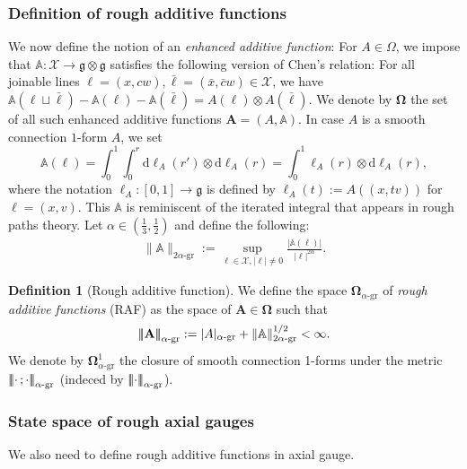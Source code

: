 \documentclass[12pt]{article}
\numberwithin{equation}{section}
\theoremstyle{definition}
\newtheorem{definition}[theorem]{Definition}
\theoremstyle{remark}
\newcommand{\diff}{\mathrm{d}}
\newcommand{\1}{\mathbf 1}
\newcommand{\<}{\langle}
\renewcommand{\>}{\rangle}
\newcommand{\gr}{\text{-}\mathrm{gr}}
\newcommand{\green}[1]{\textcolor{darkgreen}{#1}}
\newcommand{\bfA}{\mathbf A}
\newcommand{\bA}{\mathbb A}
\newcommand{\bfOmega}{\boldsymbol{\Omega}}
\newcommand{\cX}{\mathcal X}
\newcommand{\fg}{\mathfrak g}
\newcommand{\vertiii}[1]{{\left\vert\kern-0.4ex\left\vert\kern-0.4ex\left\vert #1 
    \right\vert\kern-0.4ex\right\vert\kern-0.4ex\right\vert}}
\newcommand{\triple}[1]{\vertiii{#1}}
\begin{document}
\subsubsection{Definition of rough additive functions}
%
We now define the notion of an \emph{enhanced additive function}: 
%
For $A\in\Omega$, we impose that  $\bA:\cX\to \fg\otimes \fg$ satisfies the following version of Chen's relation: 
%
For all joinable lines $\ell=(x,cw),\bar\ell=(\bar x,\bar cw)\in\cX$, we have $\bA(\ell\sqcup \bar\ell)-\bA(\ell)-\bA(\bar\ell)=A(\ell)\otimes A(\bar \ell)$.
We denote by $\bfOmega$ the set of all such enhanced additive functions $\bfA=(A,\bA)$.  In case $A$ is a smooth connection $1$-form $A$, we set
%
$$\bA(\ell)=\int^1_0\int^r_0 \diff\ell_A(r') \otimes\diff\ell_A(r)=\int^1_0\ell_A(r)\otimes\diff\ell_A(r),$$
%
where the notation $\ell_A:[0,1]\to\fg$ is defined by $\ell_A(t):=A((x,tv))$ for $\ell=(x,v)$. This $\bA$ is reminiscent of the iterated integral that appears in rough paths theory. 
%
Let $\alpha\in (\frac 13,\frac 12)$ and define the following:
\begin{align}
\|\bA\|_{2\alpha\gr}:=\sup_{\ell\in\cX,|\ell|\neq 0}\frac{|\bA(\ell)|}{|\ell|^{2\alpha}}. 
\end{align}

\begin{definition}[Rough additive function]
	We define the space $\bfOmega_{\alpha\gr}$ of \emph{rough additive functions} (RAF) as the space of $\bfA\in\bfOmega$ such that 
	\begin{align}\triple{\bfA}_{\alpha\gr}:=|A|_{\alpha\gr}+\|\bA\|_{2\alpha\gr}^{1/2}<\infty.\end{align} 
	We denote by $\bfOmega^1_{\alpha\gr}$ the closure of smooth connection 1-forms under the metric $\triple{\cdot\,;\cdot}_{\alpha\gr}$ (indeced by $\triple{\cdot}_{\alpha\gr}$). 
\end{definition}




\subsubsection{State space of rough axial gauges}
We also need to define rough additive functions in axial gauge. 
\end{document}
